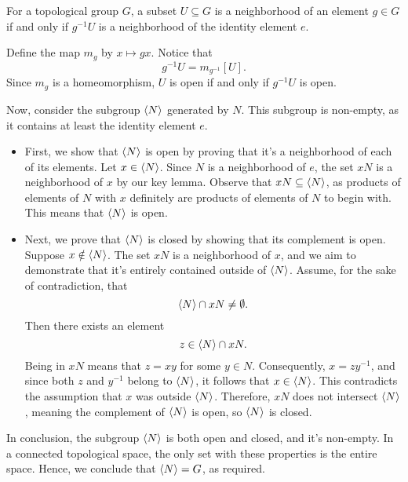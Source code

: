 \documentclass[12pt]{memoir}
\begin{document}
\begin{Lem}
For a topological group $G$, a subset $U \subseteq G$ is a neighborhood of an element $g \in G$ if and only if $g^{-1}U$ is a neighborhood of the identity element $e$.
\end{Lem}

\begin{ptcbp}
Define the map $m_g$ by $x\mapsto gx$. Notice that 
$$g^{-1}U = m_{g^{-1}}[U].$$ 
Since $m_g$ is a homeomorphism, $U$ is open if and only if $g^{-1}U$ is open.
\end{ptcbp}

\begin{ptcbr}
Now, consider the subgroup $\left\langle N\right\rangle$ generated by $N$. This subgroup is non-empty, as it contains at least the identity element $e$.

\begin{itemize}
    \item First, we show that $\left\langle N\right\rangle$ is open by proving that it's a neighborhood of each of its elements. Let $x \in \left\langle N\right\rangle$. Since $N$ is a neighborhood of $e$, the set $xN$ is a neighborhood of $x$ by our key lemma. Observe that $xN \subseteq \left\langle N\right\rangle$, as products of elements of $N$ with $x$ definitely are products of elements of $N$ to begin with. This means that $\left\langle N\right\rangle$ is open.
    
    \item Next, we prove that $\left\langle N\right\rangle$ is closed by showing that its complement is open. Suppose $x \notin \left\langle N\right\rangle$. The set $xN$ is a neighborhood of $x$, and we aim to demonstrate that it's entirely contained outside of $\left\langle N\right\rangle$. Assume, for the sake of contradiction, that 
    $$\left\langle N\right\rangle \cap xN \neq \emptyset.$$
    Then there exists an element 
    $$z \in \left\langle N\right\rangle \cap xN.$$
    Being in $xN$ means that $z = xy$ for some $y \in N$. Consequently, $x = zy^{-1}$, and since both $z$ and $y^{-1}$ belong to $\left\langle N\right\rangle$, it follows that $x \in \left\langle N\right\rangle$. This contradicts the assumption that $x$ was outside $\left\langle N\right\rangle$. Therefore, $xN$ does not intersect $\left\langle N\right\rangle$, meaning the complement of $\left\langle N\right\rangle$ is open, so $\left\langle N\right\rangle$ is closed.
\end{itemize}

In conclusion, the subgroup $\left\langle N\right\rangle$ is both open and closed, and it's non-empty. In a connected topological space, the only set with these properties is the entire space. Hence, we conclude that $\left\langle N\right\rangle = G$, as required.
\end{ptcbr}
\end{document}
